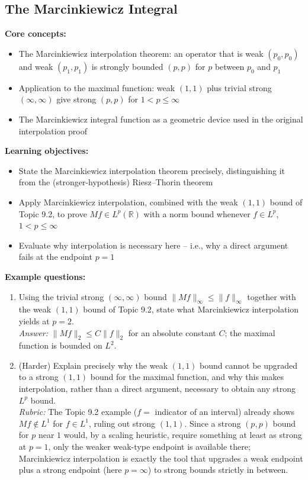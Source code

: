 \documentclass[11pt]{article}
\begin{document}
\subsection{The Marcinkiewicz Integral}

\textbf{Core concepts:}
\begin{itemize}[nosep]
\item The Marcinkiewicz interpolation theorem: an operator that is weak $(p_0,p_0)$ and weak $(p_1,p_1)$ is strongly bounded $(p,p)$ for $p$ between $p_0$ and $p_1$
\item Application to the maximal function: weak $(1,1)$ plus trivial strong $(\infty,\infty)$ give strong $(p,p)$ for $1<p\le\infty$
\item The Marcinkiewicz integral function as a geometric device used in the original interpolation proof
\end{itemize}

\textbf{Learning objectives:}
\begin{itemize}[nosep]
\item State the Marcinkiewicz interpolation theorem precisely, distinguishing it from the (stronger-hypothesis) Riesz--Thorin theorem
\item Apply Marcinkiewicz interpolation, combined with the weak $(1,1)$ bound of Topic 9.2, to prove $Mf\in L^p(\mathbb{R})$ with a norm bound whenever $f\in L^p$, $1<p\le\infty$
\item Evaluate why interpolation is necessary here -- i.e., why a direct argument fails at the endpoint $p=1$
\end{itemize}

\textbf{Example questions:}
\begin{enumerate}[nosep]
\item Using the trivial strong $(\infty,\infty)$ bound $\|Mf\|_\infty\le\|f\|_\infty$ together with the weak $(1,1)$ bound of Topic 9.2, state what Marcinkiewicz interpolation yields at $p=2$. \\
\textit{Answer:} $\|Mf\|_2\le C\|f\|_2$ for an absolute constant $C$; the maximal function is bounded on $L^2$.
\item (Harder) Explain precisely why the weak $(1,1)$ bound cannot be upgraded to a strong $(1,1)$ bound for the maximal function, and why this makes interpolation, rather than a direct argument, necessary to obtain any strong $L^p$ bound. \\
\textit{Rubric:} The Topic 9.2 example ($f=$ indicator of an interval) already shows $Mf\notin L^1$ for $f\in L^1$, ruling out strong $(1,1)$. Since a strong $(p,p)$ bound for $p$ near $1$ would, by a scaling heuristic, require something at least as strong at $p=1$, only the weaker weak-type endpoint is available there; Marcinkiewicz interpolation is exactly the tool that upgrades a weak endpoint plus a strong endpoint (here $p=\infty$) to strong bounds strictly in between.
\end{enumerate}
\end{document}
